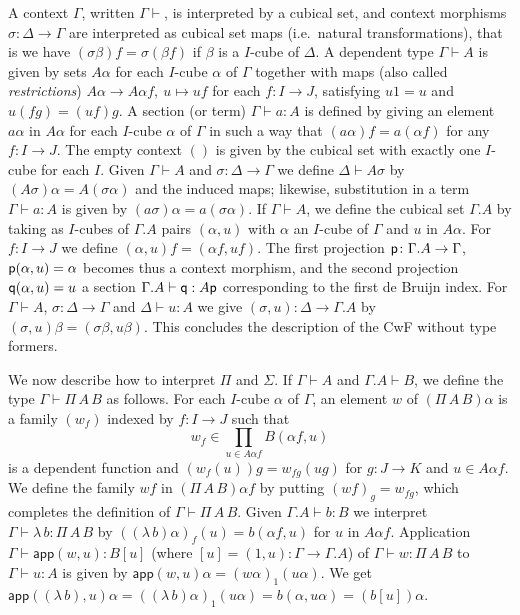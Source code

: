 \documentclass[10pt,a4paper]{article}
\newcommand{\app}{\mathsf{app}}
\newcommand{\pp}{{\sf p}}
\newcommand{\qq}{{\sf q}}
\begin{document}
A context $\Gamma$, written $\Gamma \vdash$, is interpreted by a
cubical set, and context morphisms $\sigma:\Delta\to\Gamma$ are
interpreted as cubical set maps (i.e.\ natural transformations), that
is we have $(\sigma\beta)f = \sigma(\beta f)$ if $\beta$ is a $I$-cube
of $\Delta$.  A dependent type $\Gamma\vdash A$ is given by sets
$A\alpha$ for each $I$-cube $\alpha$ of $\Gamma$ together with maps
(also called \emph{restrictions}) $A\alpha\to A\alpha f,~u\longmapsto uf$ for
each $f \colon I \to J$, satisfying $u1 = u$ and $u(fg) = (uf)g$.  A
section (or term) $\Gamma\vdash a:A$ is defined by giving an element
$a\alpha$ in $A\alpha$ for each $I$-cube $\alpha$ of $\Gamma$ in such
a way that $(a\alpha) f = a (\alpha f)$ for any $f \colon I \to J$.
The empty context $()$ is given by the cubical set with exactly one
$I$-cube for each $I$.  Given $\Gamma \vdash A$ and $\sigma \colon
\Delta \to \Gamma$ we define $\Delta \vdash A \sigma$ by $(A \sigma)
\alpha = A (\sigma \alpha)$ and the induced maps; likewise,
substitution in a term $\Gamma \vdash a : A$ is given by $(a \sigma)
\alpha = a (\sigma \alpha)$.  If $\Gamma\vdash A$, we define the
cubical set $\Gamma.A$ by taking as $I$-cubes of $\Gamma.A$ pairs
$(\alpha,u)$ with $\alpha$ an $I$-cube of $\Gamma$ and $u$ in
$A\alpha$. For $f:I\to J$ we define $(\alpha,u)f = (\alpha f,u f)$.
The first projection $\pp \colon \Gamma.A \to \Gamma$, $\pp (\alpha,
u) = \alpha$ becomes thus a context morphism, and the second
projection $\qq (\alpha, u) = u$ a section $\Gamma.A \vdash \qq : A
\pp$ corresponding to the first de Bruijn index.  For $\Gamma \vdash
A$, $\sigma \colon \Delta \to \Gamma$ and $\Delta \vdash u : A$ we
give $(\sigma, u) \colon \Delta \to \Gamma.A$ by $(\sigma, u) \beta =
(\sigma \beta, u \beta)$.  This concludes the description of the CwF
without type formers.

We now describe how to interpret $\Pi$ and $\Sigma$. If $\Gamma\vdash
A$ and $\Gamma.A\vdash B$, we define the type $\Gamma\vdash \Pi\,A\,B$
as follows.  For each $I$-cube $\alpha$ of $\Gamma$, an element $w$ of
$(\Pi\,A\,B)\alpha$ is a family $(w_f)$ indexed by $f:I\to J$ such
that 
$$w_f \in \prod_{u \in A \alpha f} B (\alpha f, u)$$
is a dependent function and $(w_f (u)) g = w_{fg} (u g)$ for $g \colon J \to K$
and $u \in A \alpha f$.  We define the family $wf$ in $(\Pi\,A\,B)
\alpha f$ by putting $(wf)_g = w_{fg}$, which completes the definition
of $\Gamma\vdash \Pi\,A\,B$.  Given $\Gamma.A \vdash b : B$ we
interpret $\Gamma \vdash \lambda\,b : \Pi\,A\,B$ by $ ((\lambda\, b)
\alpha)_f (u) = b (\alpha f, u)$ for $u$ in $A \alpha f$.  Application
$\Gamma \vdash \app (w,u) : B [u]$ (where $[u] = (1, u) \colon \Gamma
\to \Gamma.A$) of $\Gamma \vdash w : \Pi\,A\,B$ to $\Gamma \vdash u :
A$ is given by $\app (w, u) \alpha = (w\alpha)_1 (u\alpha)$.  We get
$\app ((\lambda\,b), u) \alpha = ((\lambda\,b) \alpha)_1 (u \alpha) =
b (\alpha, u\alpha) = (b [u]) \alpha$.
\end{document}

